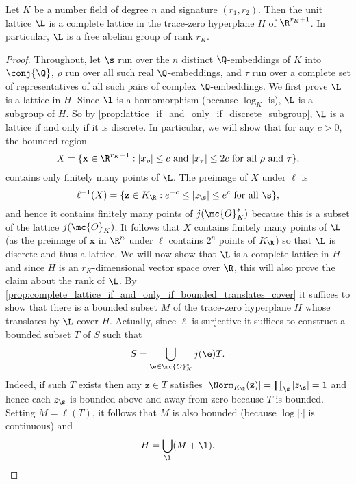       \begin{theorem}\label{thm:unit_group_complete_lattice}
        Let $K$ be a number field of degree $n$ and signature $(r_{1},r_{2})$. Then the unit lattice $\L$ is a complete lattice in the trace-zero hyperplane $H$ of $\R^{r_{K}+1}$. In particular, $\L$ is a free abelian group of rank $r_{K}$.
      \end{theorem}
      \begin{proof}
        Throughout, let $\s$ run over the $n$ distinct $\Q$-embeddings of $K$ into $\conj{\Q}$, $\rho$ run over all such real $\Q$-embeddings, and $\tau$ run over a complete set of representatives of all such pairs of complex $\Q$-embeddings. We first prove $\L$ is a lattice in $H$. Since $\l$ is a homomorphism (because $\log_{K}$ is), $\L$ is a subgroup of $H$. So by \cref{prop:lattice_if_and_only_if_discrete_subgroup}, $\L$ is a lattice if and only if it is discrete. In particular, we will show that for any $c > 0$, the bounded region
        \[
          X = \{\mathbf{x} \in \R^{r_{K}+1}:\text{$|x_{\rho}| \le c$ and $|x_{\tau}| \le 2c$ for all $\rho$ and $\tau$}\},
        \]
        contains only finitely many points of $\L$. The preimage of $X$ under $\ell$ is
        \[
          \ell^{-1}(X) = \{\mathbf{z} \in K_{\R}:\text{$e^{-c} \le |z_{\s}| \le e^{c}$ for all $\s$}\},
        \]
        and hence it contains finitely many points of $j(\mc{O}_{K}^{\ast})$ because this is a subset of the lattice $j(\mc{O}_{K})$. It follows that $X$ contains finitely many points of $\L$ (as the preimage of $\mathbf{x}$ in $\R^{n}$ under $\ell$ contains $2^{n}$ points of $K_{\R}$) so that $\L$ is discrete and thus a lattice. We will now show that $\L$ is a complete lattice in $H$ and since $H$ is an $r_{K}$-dimensional vector space over $\R$, this will also prove the claim about the rank of $\L$. By \cref{prop:complete_lattice_if_and_only_if_bounded_translates_cover} it suffices to show that there is a bounded subset $M$ of the trace-zero hyperplane $H$ whose translates by $\L$ cover $H$. Actually, since $\ell$ is surjective it suffices to construct a bounded subset $T$ of $S$ such that
        \[
          S = \bigcup_{\e \in \mc{O}_{K}^{\ast}}j(\e)T.
        \]
        Indeed, if such $T$ exists then any $\mathbf{z} \in T$ satisfies $|\Norm_{K_{\R}}(\mathbf{z})| = \prod_{\s}|z_{\s}| = 1$ and hence each $z_{\s}$ is bounded above and away from zero because $T$ is bounded. Setting $M = \ell(T)$, it follows that $M$ is also bounded (because $\log|\cdot|$ is continuous) and
        \[
          H = \bigcup_{\l}(M+\l).
\]
\end{proof}
